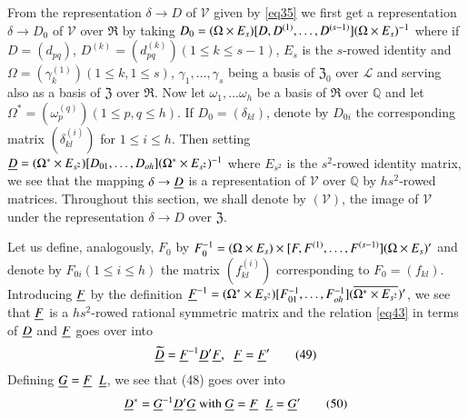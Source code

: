 From the representation $\delta \rightarrow D$ of $\mathscr{V}$ given
by \eqref{eq35} we first get a representation $\delta \rightarrow D_0$ of
$\mathscr{V}$ over $\mathfrak{R}$ by taking $D_0 = (\Omega \times E_s)
[D, D^{(1)},\ldots,\break D^{(s-1)}](\Omega \times E_s)^{-1}$ where if $D=
(d_{pq})$, $D^{(k)} = \left(d^{(k)}_{pq}\right)(1\leq k \leq s-1)$, $E_s$ is the
$s$-rowed identity and $\Omega=\left(\gamma^{(1)}_k\right)(1\leq k, 1\leq s)$,
$\gamma_1,\ldots, \gamma_s$ being a basis of $\mathfrak{Z}_0$ over
\pageoriginale $\mathscr{L}$ and serving also as a basis of
$\mathfrak{Z}$ over $\mathfrak{R}$. Now let $\omega_1, \ldots
\omega_h$ be a basis of $\mathfrak{R}$ over $\mathbb{Q}$ and let
$\Omega^{\ast} = \left(\omega^{(q)}_p\right) (1\leq p, q \leq h)$. If $D_0 =
(\delta_{kl})$, denote by $D_{0i}$ the corresponding matrix
$\left(\delta^{(i)}_{kl}\right)$ for $1\leq i \leq h$. Then setting $\underline{D} =
(\Omega^{\ast} \times E_{s^2})[D_{01},\ldots, D_{oh}](\Omega^{\ast}
\times E_{s^2})^{-1}$ where $E_{s^2}$ is the $s^2$-rowed identity
matrix, we see that the mapping $\delta \rightarrow \underline{D}$ is a
representation of $\mathscr{V}$ over $\mathbb{Q}$ by $hs^2$-rowed
matrices. Throughout this section, we shall denote by $(\mathscr{V})$,
the image of $\mathscr{V}$ under the representation $\delta\rightarrow
D$ over $\mathfrak{Z}$. 

Let us define, analogously, $F_0$ by $F^{-1}_0 = (\Omega \times E_s)
\times [F,F^{(1)},\ldots,\break F^{(s-1)}] (\Omega \times E_s)'$ and denote
by $F_{0i}(1\leq i \leq h)$ the matrix $\left(f^{(i)}_{kl}\right)$
corresponding to $F_0=(f_{kl})$. Introducing $\underline{F}$ by the
definition $\underline{F}^{-1} = (\Omega^{\ast} \times E_{s^2})
[F^{-1}_{01},\ldots, F^{-1}_{oh}](\overline{\Omega^{\ast} \times
  E_{s^2}})'$, we see that $\underline{F}$ is a $hs^2$-rowed rational
symmetric matrix and the relation \eqref{eq43} in terms of $\underline{D}$ and
$\underline{F}$ goes over into
\begin{equation*}
\underline{\widetilde{D}} = \underline{F}^{-1} \underline{D}' \underline{F}, \;\; \underline{F} = \underline{F}'
\tag{49} \label{eq49}
\end{equation*} 
Defining $\underline{G} =\underline{F}\;\;\underline{L}$, we see that (48) goes over into
\begin{equation*}
\underline{D}^{\ast} = \underline{G}^{-1} \underline{D}' \underline{G} \text{ with } \underline{G} =
\underline{F} \;\; \underline{L} = \underline{G}' \tag{50}\label{eq50}
\end{equation*}

